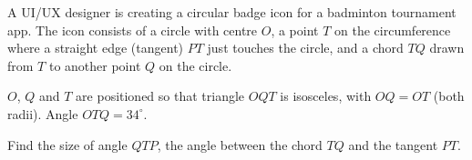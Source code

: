 \begin{question}
\noindent A UI/UX designer is creating a circular badge icon for a badminton tournament app. The icon consists of a circle with centre $O$, a point $T$ on the circumference where a straight edge (tangent) $PT$ just touches the circle, and a chord $TQ$ drawn from $T$ to another point $Q$ on the circle.

$O$, $Q$ and $T$ are positioned so that triangle $OQT$ is isosceles, with $OQ = OT$ (both radii). Angle $OTQ = 34^\circ$.

\begin{center}
\end{center}

\noindent Find the size of angle $QTP$, the angle between the chord $TQ$ and the tangent $PT$.

\vspace{4cm}

\begin{flushright}
\end{flushright}
\end{question}
